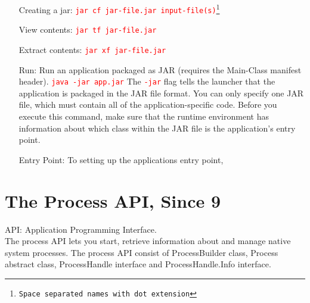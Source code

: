 \documentclass[10 pt]{article}
\newcommand{\R}{\textcolor{red}} %
\newcommand{\T}{\texttt}
\begin{document}
\begin{enumerate}
	\item[Creating a jar: ] \R{\T{jar cf jar-file.jar input-file(s)\footnote{Space separated names with dot extension}}}
	\item[View contents: ] \R{\T{jar tf jar-file.jar}}
	\item[Extract contents: ] \R{\T{jar xf jar-file.jar}}
	\item[Run: ] Run an application packaged as JAR (requires the Main-Class manifest header). \R{\T{java -jar app.jar}} The \R{\T{-jar}} flag tells the launcher that the application is packaged in the JAR file format. You can only specify one JAR file, which must contain all of the application-specific code. Before you execute this command, make sure that the runtime environment has information about which class within the JAR file is the application's entry point.
	\item[Entry Point: ] To setting up the applications entry point,
\end{enumerate}

\section{The Process API, Since 9}
API: Application Programming Interface. \\
The process API lets you start, retrieve information about and manage native system processes. The process API consist of ProcessBuilder class, Process abstract class, ProcessHandle interface and ProcessHandle.Info interface.
\end{document}
